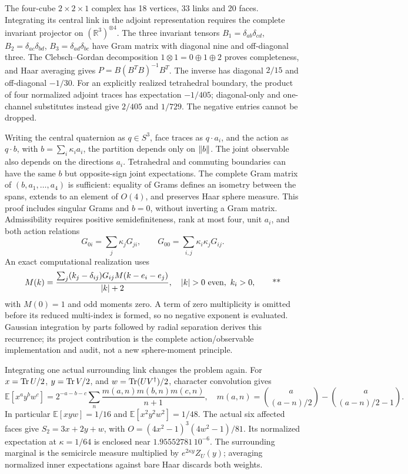 The four-cube \(2\times2\times1\) complex has 18 vertices, 33 links and
20 faces. Integrating its central link in the adjoint representation
requires the complete invariant projector on \((\mathbb R^3)^{\otimes4}\).
The three invariant tensors
\(B_1=\delta_{ab}\delta_{cd}\),
\(B_2=\delta_{ac}\delta_{bd}\),
\(B_3=\delta_{ad}\delta_{bc}\)
have Gram matrix with diagonal nine and off-diagonal three. The
Clebsch--Gordan decomposition
\(1\otimes1=0\oplus1\oplus2\) proves completeness, and Haar averaging gives
\(P=B(B^TB)^{-1}B^T\). The inverse has diagonal \(2/15\) and
off-diagonal \(-1/30\). For an explicitly realized tetrahedral boundary,
the product of four normalized adjoint traces has expectation
\(-1/405\); diagonal-only and one-channel substitutes instead give
\(2/405\) and \(1/729\). The negative entries cannot be dropped.

Writing the central quaternion as \(q\in S^3\), face traces as
\(q\cdot a_i\), and the action as \(q\cdot b\), with
\(b=\sum_i\kappa_i a_i\), the partition depends only on \(\left\lVert b\right\rVert\).
The joint observable also depends on the directions \(a_i\). Tetrahedral
and commuting boundaries can have the same \(b\) but opposite-sign
joint expectations. The complete Gram matrix of
\((b,a_1,\ldots,a_4)\) is sufficient: equality of Grams defines an isometry
between the spans, extends to an element of \(O(4)\), and preserves Haar
sphere measure. This proof includes singular Grams and \(b=0\), without
inverting a Gram matrix. Admissibility requires positive semidefiniteness,
rank at most four, unit \(a_i\), and both action relations
\[
 G_{0i}=\sum_j\kappa_jG_{ji},\qquad
 G_{00}=\sum_{i,j}\kappa_i\kappa_jG_{ij}.
\]
An exact computational realization uses
\begin{equation}
 M(k)=\frac{\sum_j(k_j-\delta_{ij})G_{ij}
                     M(k-e_i-e_j)}{|k|+2},
 \quad |k|>0\ {\rm even},\ k_i>0,
 \qquad\text{\workstar}
 \label{eq:middle-gram}
\end{equation}
with \(M(0)=1\) and odd moments zero. A term of zero multiplicity is
omitted before its reduced multi-index is formed, so no negative
exponent is evaluated. Gaussian integration by parts
followed by radial separation derives this recurrence; its project
contribution is the complete action/observable implementation and audit,
not a new sphere-moment principle.

Integrating one actual surrounding link changes the problem again.
For \(x=\operatorname{Tr} U/2\), \(y=\operatorname{Tr} V/2\), and
\(w=\operatorname{Tr}(UV^\dagger)/2\), character convolution gives
\[
 \mathbb E[x^ay^bw^c]
 =2^{-a-b-c}\sum_n\frac{m(a,n)m(b,n)m(c,n)}{n+1},
 \quad
 m(a,n)=\binom a{(a-n)/2}-\binom a{(a-n)/2-1}.
\]
In particular \(\mathbb E[xyw]=1/16\) and
\(\mathbb E[x^2y^2w^2]=1/48\).
The actual six affected faces give \(S_2=3x+2y+w\), with
\(O=(4x^2-1)^3(4w^2-1)/81\). Its normalized expectation at
\(\kappa=1/64\) is enclosed near \(1.95552781\,10^{-6}\).
The surrounding marginal is the semicircle measure multiplied by
\(e^{2\kappa y}Z_U(y)\); averaging normalized inner expectations against
bare Haar discards both weights.

